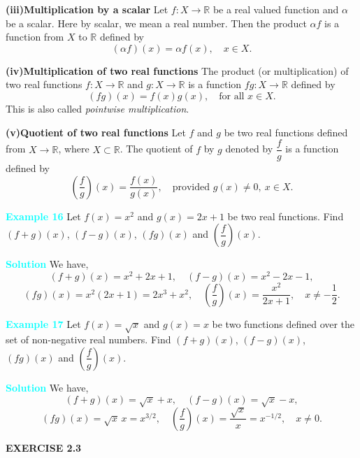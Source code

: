 \documentclass[11pt]{article}
\begin{document}
\medskip

\noindent
\textbf{(iii)\quad Multiplication by a scalar}  
Let $f : X \to \mathbb{R}$ be a real valued function and $\alpha$ be a
scalar. Here by scalar, we mean a real number. Then the product
$\alpha f$ is a function from $X$ to $\mathbb{R}$ defined by
\[
(\alpha f)(x) = \alpha f(x), \quad x \in X.
\]

\medskip

\noindent
\textbf{(iv)\quad Multiplication of two real functions}  
The product (or multiplication) of two real functions
$f : X \to \mathbb{R}$ and $g : X \to \mathbb{R}$ is a function
$fg : X \to \mathbb{R}$ defined by
\[
(fg)(x) = f(x) g(x), \quad \text{for all } x \in X.
\]
This is also called \emph{pointwise multiplication}.

\medskip

\noindent
\textbf{(v)\quad Quotient of two real functions}  
Let $f$ and $g$ be two real functions defined from
$X \to \mathbb{R}$, where $X \subset \mathbb{R}$. The quotient of $f$ by
$g$ denoted by $\dfrac{f}{g}$ is a function defined by
\[
\left(\frac{f}{g}\right)(x) = \frac{f(x)}{g(x)}, \quad
\text{provided } g(x) \neq 0,\ x \in X.
\]

\medskip

\noindent\textcolor{cyan}{\textbf{Example 16}}  
Let $f(x) = x^{2}$ and $g(x) = 2x + 1$ be two real functions.
Find $(f+g)(x)$, $(f-g)(x)$, $(fg)(x)$ and
$\left(\dfrac{f}{g}\right)(x)$.

\medskip

\noindent\textcolor{cyan}{\textbf{Solution}}  
We have,
\[
(f+g)(x) = x^{2} + 2x + 1,
\quad
(f-g)(x) = x^{2} - 2x - 1,
\]
\[
(fg)(x) = x^{2}(2x+1) = 2x^{3} + x^{2},
\quad
\left(\frac{f}{g}\right)(x) = \frac{x^{2}}{2x+1},
\quad x \neq -\frac{1}{2}.
\]

\medskip

\noindent\textcolor{cyan}{\textbf{Example 17}}  
Let $f(x) = \sqrt{x}$ and $g(x) = x$ be two functions defined over the set
of non-negative real numbers. Find $(f+g)(x)$, $(f-g)(x)$, $(fg)(x)$ and
$\left(\dfrac{f}{g}\right)(x)$.

\medskip

\noindent\textcolor{cyan}{\textbf{Solution}}  
We have,
\[
(f+g)(x) = \sqrt{x} + x,
\quad
(f-g)(x) = \sqrt{x} - x,
\]
\[
(fg)(x) = \sqrt{x}\,x = x^{3/2},
\quad
\left(\frac{f}{g}\right)(x) = \frac{\sqrt{x}}{x} = x^{-1/2},
\quad x \neq 0.
\]
\newpage

\begin{center}
\begin{tcolorbox}[
  enhanced,
  width=0.25\textwidth,   
  colback=cyan!20,
  colframe=cyan!80!black,
  boxrule=1.2pt,
  arc=0mm,               
  left=10pt,
  right=10pt,
  top=8pt,
  bottom=8pt
]
\centering
\textbf{\textcolor{cyan!80!black}{EXERCISE 2.3}}
\end{tcolorbox}
\end{center}
\medskip
\end{document}
